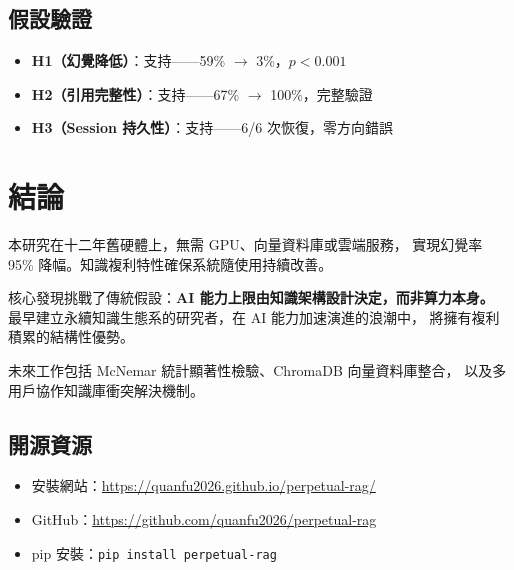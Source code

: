 \documentclass[conference]{IEEEtran}
\begin{document}
\subsection{假設驗證}

\begin{itemize}
  \item \textbf{H1（幻覺降低）}：支持——59\% $\to$ 3\%，$p < 0.001$
  \item \textbf{H2（引用完整性）}：支持——67\% $\to$ 100\%，完整驗證
  \item \textbf{H3（Session 持久性）}：支持——6/6 次恢復，零方向錯誤
\end{itemize}

\section{結論}

本研究在十二年舊硬體上，無需 GPU、向量資料庫或雲端服務，
實現幻覺率 95\% 降幅。知識複利特性確保系統隨使用持續改善。

核心發現挑戰了傳統假設：\textbf{AI 能力上限由知識架構設計決定，而非算力本身。}
最早建立永續知識生態系的研究者，在 AI 能力加速演進的浪潮中，
將擁有複利積累的結構性優勢。

未來工作包括 McNemar 統計顯著性檢驗、ChromaDB 向量資料庫整合，
以及多用戶協作知識庫衝突解決機制。

\subsection*{開源資源}
\begin{itemize}
  \item 安裝網站：\url{https://quanfu2026.github.io/perpetual-rag/}
  \item GitHub：\url{https://github.com/quanfu2026/perpetual-rag}
  \item pip 安裝：\texttt{pip install perpetual-rag}
\end{itemize}



\end{document}
